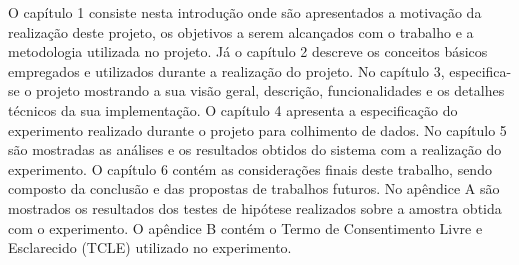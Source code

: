  O capítulo 1 consiste nesta introdução onde são apresentados a motivação da realização deste projeto, os objetivos a serem alcançados com o trabalho e a metodologia utilizada no projeto.
 Já o capítulo 2 descreve os conceitos básicos empregados e utilizados durante a realização do projeto.
 No capítulo 3,	especifica-se o projeto mostrando a sua visão geral, descrição, funcionalidades e os detalhes técnicos da sua implementação.
 O capítulo 4 apresenta a especificação do experimento realizado durante o projeto para colhimento de dados.
 No capítulo 5 são mostradas as análises e os resultados obtidos do sistema com a realização do experimento.
 O capítulo 6 contém as considerações finais deste trabalho, sendo composto da conclusão e das propostas de trabalhos futuros.
 No apêndice A são mostrados os resultados dos testes de hipótese realizados sobre a amostra obtida com o experimento.
 O apêndice B contém o Termo de Consentimento Livre e Esclarecido (TCLE) utilizado no experimento.


